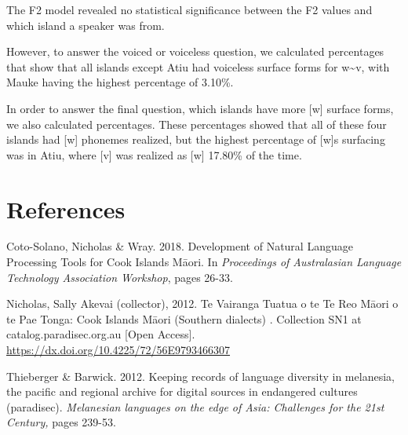 \documentclass[
  ,man,floatsintext]{apa6}
\begin{document}
The F2 model revealed no statistical significance between the F2 values and which island a speaker was from.

However, to answer the voiced or voiceless question, we calculated percentages that show that all islands except Atiu had voiceless surface forms for w\textasciitilde v, with Mauke having the highest percentage of 3.10\%.

In order to answer the final question, which islands have more {[}w{]} surface forms, we also calculated percentages. These percentages showed that all of these four islands had {[}w{]} phonemes realized, but the highest percentage of {[}w{]}s surfacing was in Atiu, where {[}v{]} was realized as {[}w{]} 17.80\% of the time.

\section{References}\label{references}

\begingroup

Coto-Solano, Nicholas \& Wray. 2018. Development of Natural Language Processing Tools for Cook Islands Māori. In \emph{Proceedings of Australasian Language Technology Association Workshop}, pages 26-33.

Nicholas, Sally Akevai (collector), 2012. Te Vairanga Tuatua o te Te Reo Māori o te Pae Tonga: Cook Islands Māori (Southern dialects) . Collection SN1 at catalog.paradisec.org.au {[}Open Access{]}. \url{https://dx.doi.org/10.4225/72/56E9793466307}

Thieberger \& Barwick. 2012. Keeping records of language diversity in melanesia, the pacific and regional archive for digital sources in endangered cultures (paradisec). \emph{Melanesian languages on the edge of Asia: Challenges for the 21st Century,} pages 239-53.

\setlength{\parindent}{-0.5in}
\setlength{\leftskip}{0.5in}

\endgroup


\clearpage
\renewcommand{\listfigurename}{Figure captions}

\clearpage
\renewcommand{\listtablename}{Table captions}
\end{document}

